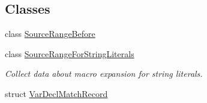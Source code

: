 \subsection*{Classes}
\begin{DoxyCompactItemize}
\item 
class \hyperlink{classclang_1_1tidy_1_1pagesjaunes_1_1_exec_s_q_l_close_to_function_call_1_1_source_range_before}{Source\+Range\+Before}
\item 
class \hyperlink{classclang_1_1tidy_1_1pagesjaunes_1_1_exec_s_q_l_close_to_function_call_1_1_source_range_for_string_literals}{Source\+Range\+For\+String\+Literals}
\begin{DoxyCompactList}\small\item\em Collect data about macro expansion for string literals. \end{DoxyCompactList}\item 
struct \hyperlink{structclang_1_1tidy_1_1pagesjaunes_1_1_exec_s_q_l_close_to_function_call_1_1_var_decl_match_record}{Var\+Decl\+Match\+Record}
\end{DoxyCompactItemize}
